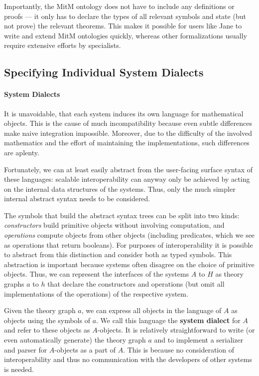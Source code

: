 Importantly, the MitM ontology does not have to include any definitions or
proofs --- it only has to declare the types of all relevant symbols and state
(but not prove) the relevant theorems. This makes it possible for users like
Jane to write and extend MitM ontologies quickly, whereas other formalizations
usually require extensive efforts by specialists.

\subsection{Specifying Individual System Dialects}\label{sec:mitm:dialect}

\paragraph{System Dialects}
It is unavoidable, that each system induces its own language for mathematical objects.
This is the cause of much incompatibility because even subtle differences make naive integration impossible.
Moreover, due to the difficulty of the involved mathematics and the effort of maintaining the implementations, such differences are aplenty.

Fortunately, we can at least easily abstract from the user-facing surface syntax of these languages:
scalable interoperability can anyway only be achieved by acting on the internal data structures of the systems.
Thus, only the much simpler internal abstract syntax needs to be considered.

The symbols that build the abstract syntax trees can be split into two kinds: \emph{constructors} build primitive objects without involving computation, and \emph{operations}
compute objects from other objects (including predicates, which we see as operations that return booleans).
For purposes of interoperability it is possible to abstract from this distinction and consider both as typed symbols.
This abstraction is important because systems often disagree on the choice of primitive objects.
Thus, we can represent the interfaces of the systems $A$ to $H$ as \OMMT theory graphs $a$ to $h$ that declare the constructors and operations (but omit all implementations of the operations) of the respective system.

Given the theory graph $a$, we can express all objects in the language of $A$ as \OMMT objects using the symbols of $a$.
We call this language the \textbf{\OMMT system dialect} for $A$ and refer to these objects as $A$-objects.
It is relatively straightforward to write (or even automatically generate) the theory graph $a$ and to implement a serializer and parser for $A$-objects as a part of $A$.
This is because no consideration of interoperability and thus no communication with the developers of other systems is needed.

